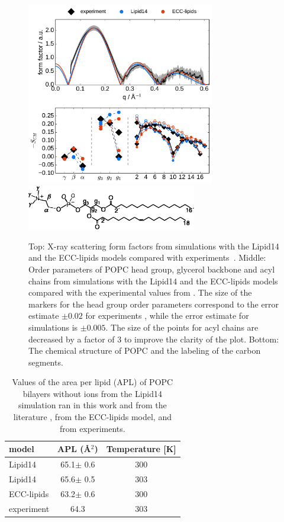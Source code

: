 \documentclass[aip,jcp,twocolumn]{revtex4}
\begin{document}
\begin{figure}[tb!]
  \centering
  \includegraphics[width=8.2cm]{../Fig/ipython_nb/Order-parameters_form-factors_exp-L14-ECCL17_q80_sig89.pdf}
  \includegraphics[width=7.4cm]{../Fig/POPCstructure.eps}
  \caption{\label{simVSexpNOions}
    Top: X-ray scattering form factors from simulations with the Lipid14 \cite{dickson14} and
    the ECC-lipids models compared with experiments~\cite{Kucerka2011}.
    Middle: Order parameters of POPC head group, glycerol backbone and acyl chains 
    from simulations with the Lipid14 \cite{dickson14} and the ECC-lipids models
    compared with the experimental values from \cite{ferreira13}.
    The size of the markers for the head group order parameters correspond to
    the error estimate $\pm 0.02$ for experiments \cite{botan15,ollila16},
    while the error estimate for simulations is $\pm 0.005$.
    The size of the points for acyl chains are decreased by a factor of 3 to improve the clarity of the plot.
    Bottom: The chemical structure of POPC and the labeling of the carbon segments.
  } 
\end{figure}

\begin{table}[tb!]
  \caption{Values of the area per lipid (APL) of POPC bilayers without ions from the Lipid14 simulation
    ran in this work and from the literature \cite{dickson14}, from the ECC-lipids model, and from experiments.\label{tab:apls} }
  \begin{tabular}{l|c c}
    model          & APL (\AA$^2$)   & Temperature [K] \\
    \hline
    Lipid14                   & 65.1$\pm$ 0.6  &  300 \\
    Lipid14 \cite{dickson14}  & 65.6$\pm$ 0.5  &  303 \\
    \hline
    ECC-lipids                & 63.2$\pm$ 0.6  &  300       \\
    \hline
    experiment \cite{kucerka11} & 64.3  &  303    \\
    \hline
  \end{tabular}
\end{table}
\end{document}
